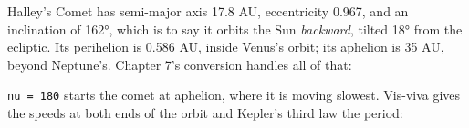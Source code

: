\documentclass[
  10.5pt,
  letterpaper,
]{scrbook}
\newenvironment{Shaded}{\begin{snugshade}}{\end{snugshade}}
\newcommand{\AttributeTok}[1]{\textcolor[rgb]{0.00,0.00,0.00}{#1}}
\newcommand{\DecValTok}[1]{\textcolor[rgb]{0.00,0.00,0.00}{#1}}
\newcommand{\FloatTok}[1]{\textcolor[rgb]{0.00,0.00,0.00}{#1}}
\newcommand{\FunctionTok}[1]{\textcolor[rgb]{0.00,0.00,0.00}{#1}}
\newcommand{\NormalTok}[1]{\textcolor[rgb]{0.00,0.00,0.00}{#1}}
\newcommand{\OtherTok}[1]{\textcolor[rgb]{0.00,0.00,0.00}{#1}}
\newcommand{\SpecialCharTok}[1]{\textcolor[rgb]{0.00,0.00,0.00}{#1}}
\newcommand{\StringTok}[1]{\textcolor[rgb]{0.00,0.00,0.00}{#1}}
\theoremstyle{definition}
\theoremstyle{plain}
\theoremstyle{remark}
\begin{document}
Halley's Comet has semi-major axis 17.8 AU, eccentricity 0.967, and an
inclination of 162°, which is to say it orbits the Sun \emph{backward},
tilted 18° from the ecliptic. Its perihelion is 0.586 AU, inside Venus's
orbit; its aphelion is 35 AU, beyond Neptune's. Chapter 7's conversion
handles all of that:

\begin{Shaded}
\end{Shaded}

\texttt{nu\ =\ 180} starts the comet at aphelion, where it is moving
slowest. Vis-viva gives the speeds at both ends of the orbit and
Kepler's third law the period:
\end{document}

